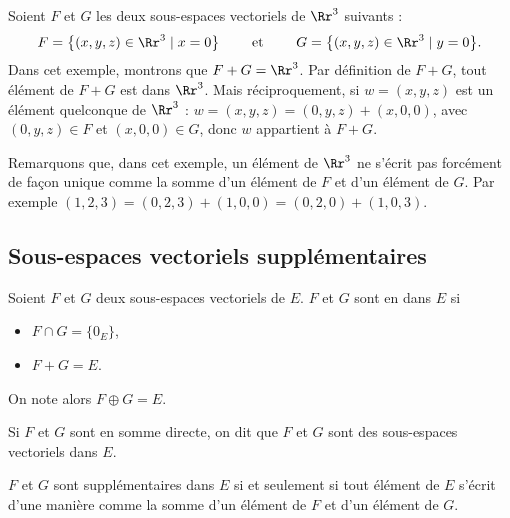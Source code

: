 \documentclass[class=report,crop=false]{standalone}
\begin{document}
\begin{exemple}
Soient $F$ et $G$ les deux sous-espaces vectoriels de $\Rr^3$ suivants :
$$F=\big\{(x,y,z) \in \Rr^3\mid x=0\big\}
\qquad \text{ et } \qquad
G=\big\{(x,y,z) \in \Rr^3 \mid y=0\big\}.$$
Dans cet exemple, montrons que $F+G=\Rr^3$.
Par définition de $F+G$, tout élément de  $F+G$ est dans $\Rr^3$.
Mais réciproquement, si  $w=(x,y,z)$ est un élément quelconque
de $\Rr^3$ : $w=(x,y,z)=(0,y,z)+(x,0,0)$, avec
$(0,y,z) \in F$ et $(x,0,0) \in G$, donc $w$ appartient à $F+G$.

Remarquons que, dans cet exemple, un élément de $\Rr^3$ ne s'écrit pas forcément de façon unique
comme la somme d'un élément de $F$ et d'un élément de $G$. Par exemple
$(1,2,3)=(0,2,3)+ (1,0,0)= (0,2,0)+(1,0,3).$
\end{exemple}

\subsection{Sous-espaces vectoriels supplémentaires}

\begin{definition}
Soient $F$ et $G$ deux sous-espaces vectoriels de $E$.
$F$ et $G$ sont en 
 dans $E$ si
\begin{itemize}
  \item $F \cap G = \{ 0_E \}$,
  \item $F+G=E$.
\end{itemize}
On note alors $F \oplus G=E$\index{$\oplus$}.
\end{definition}

Si $F$ et $G$ sont en somme directe,
on dit que $F$ et $G$ sont des sous-espaces vectoriels  dans $E$.

\begin{proposition}
\label{prop:directeunique}
$F$ et $G$ sont supplémentaires dans $E$ si et seulement si tout
élément de $E$ s'écrit d'une manière 
comme la somme d'un élément de $F$ et d'un élément de $G$.
\end{proposition}
\end{document}
